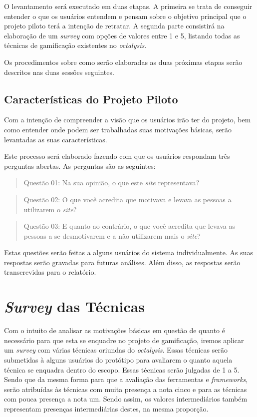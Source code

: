 O levantamento será executado em duas etapas. A primeira se trata de conseguir entender o que os usuários entendem e pensam sobre o objetivo
principal que o projeto piloto terá a intenção de retratar. A segunda parte consistirá na elaboração de um \textit{survey} com opções de valores entre 1 e 5,
listando todas as técnicas de gamificação existentes no \textit{octalysis}.

Os procedimentos sobre como serão elaboradas as duas próximas etapas serão descritos nas duas sessões seguintes. 

\subsection{Características do Projeto Piloto}
\label{sub:caracter_sticas_projeto_do_piloto}
Com a intenção de compreender a visão que os usuários irão ter do projeto, bem como entender onde podem ser trabalhadas suas motivações básicas,
serão levantadas as suas características.

Este processo será elaborado fazendo com que os usuários respondam três perguntas abertas. As perguntas são as seguintes:

\begin{quotation}
    Questão 01: Na sua opinião, o que este \textit{site} representava?
\end{quotation}

\begin{quotation}
    Questão 02: O que você acredita que motivava e levava as pessoas a utilizarem o \textit{site}?
\end{quotation}

\begin{quotation}
    Questão 03: E quanto ao contrário, o que você acredita que levava as pessoas a se desmotivarem e a não
    utilizarem mais o \textit{site}?
\end{quotation}

Estas questões serão feitas a alguns usuários do sistema individualmente. As suas respostas serão gravadas para futuras análises.
Além disso, as respostas serão transcrevidas para o relatório.

\section{\textit{Survey} das Técnicas}
\label{sub:survey_das_t_cnicas}
Com o intuito de analisar as motivações básicas em questão de quanto é necessário para que esta se enquadre no projeto
de gamificação, iremos aplicar um \textit{survey} com várias técnicas oriundas do \textit{octalysis}. Essas técnicas serão submetidas à alguns
usuários do protótipo para avaliarem o quanto aquela técnica se enquadra dentro do escopo. Essas técnicas serão julgadas de 1
a 5. Sendo que da mesma forma para que a avaliação das ferramentas e \textit{frameworks}, serão atribuídas às técnicas com
muita presença a nota cinco e para as técnicas com pouca presença a nota um. Sendo assim, os valores intermediários
também representam presenças intermediárias destes, na mesma proporção.

